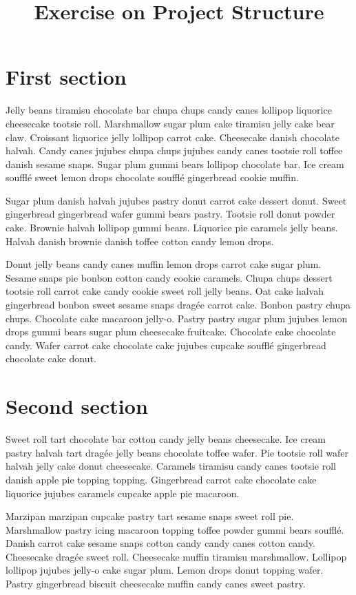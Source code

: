 \documentclass{article}
\title{Exercise on Project Structure}
\begin{document}
\maketitle
\tableofcontents

\newpage
\section{First section}
Jelly beans tiramisu chocolate bar chupa chups candy canes lollipop liquorice cheesecake tootsie roll. Marshmallow sugar plum cake tiramisu jelly cake bear claw. Croissant liquorice jelly lollipop carrot cake. Cheesecake danish chocolate halvah. Candy canes jujubes chupa chups jujubes candy canes tootsie roll toffee danish sesame snaps. Sugar plum gummi bears lollipop chocolate bar. Ice cream soufflé sweet lemon drops chocolate soufflé gingerbread cookie muffin.

Sugar plum danish halvah jujubes pastry donut carrot cake dessert donut. Sweet gingerbread gingerbread wafer gummi bears pastry. Tootsie roll donut powder cake. Brownie halvah lollipop gummi bears. Liquorice pie caramels jelly beans. Halvah danish brownie danish toffee cotton candy lemon drops.

Donut jelly beans candy canes muffin lemon drops carrot cake sugar plum. Sesame snaps pie bonbon cotton candy cookie caramels. Chupa chups dessert tootsie roll carrot cake candy cookie sweet roll jelly beans. Oat cake halvah gingerbread bonbon sweet sesame snaps dragée carrot cake. Bonbon pastry chupa chups. Chocolate cake macaroon jelly-o. Pastry pastry sugar plum jujubes lemon drops gummi bears sugar plum cheesecake fruitcake. Chocolate cake chocolate candy. Wafer carrot cake chocolate cake jujubes cupcake soufflé gingerbread chocolate cake donut.

\newpage
\section{Second section}

Sweet roll tart chocolate bar cotton candy jelly beans cheesecake. Ice cream pastry halvah tart dragée jelly beans chocolate toffee wafer. Pie tootsie roll wafer halvah jelly cake donut cheesecake. Caramels tiramisu candy canes tootsie roll danish apple pie topping topping. Gingerbread carrot cake chocolate cake liquorice jujubes caramels cupcake apple pie macaroon.

Marzipan marzipan cupcake pastry tart sesame snaps sweet roll pie. Marshmallow pastry icing macaroon topping toffee powder gummi bears soufflé. Danish carrot cake sesame snaps cotton candy candy canes cotton candy. Cheesecake dragée sweet roll. Cheesecake muffin tiramisu marshmallow. Lollipop lollipop jujubes jelly-o cake sugar plum. Lemon drops donut topping wafer. Pastry gingerbread biscuit cheesecake muffin candy canes sweet pastry. 
\end{document}
